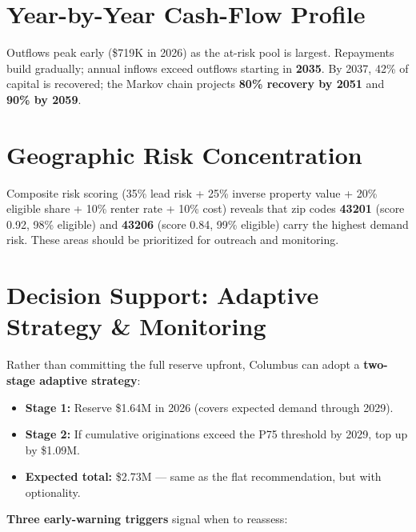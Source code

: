 \documentclass[11pt, letterpaper]{article}
\begin{document}
\vspace{-0.2cm}
\section*{Year-by-Year Cash-Flow Profile}

Outflows peak early (\$719K in 2026) as the at-risk pool is largest. Repayments build gradually; annual inflows exceed outflows starting in \textbf{2035}. By 2037, 42\% of capital is recovered; the Markov chain projects \textbf{80\% recovery by 2051} and \textbf{90\% by 2059}.

\vspace{-0.2cm}
\section*{Geographic Risk Concentration}

Composite risk scoring (35\% lead risk + 25\% inverse property value + 20\% eligible share + 10\% renter rate + 10\% cost) reveals that zip codes \textbf{43201} (score 0.92, 98\% eligible) and \textbf{43206} (score 0.84, 99\% eligible) carry the highest demand risk. These areas should be prioritized for outreach and monitoring.

\vspace{-0.2cm}
\section*{Decision Support: Adaptive Strategy \& Monitoring}

Rather than committing the full reserve upfront, Columbus can adopt a \textbf{two-stage adaptive strategy}:

\begin{itemize}[nosep, leftmargin=1.5em]
    \item \textbf{Stage 1:} Reserve \$1.64M in 2026 (covers expected demand through 2029).
    \item \textbf{Stage 2:} If cumulative originations exceed the P75 threshold by 2029, top up by \$1.09M.
    \item \textbf{Expected total:} \$2.73M --- same as the flat recommendation, but with optionality.
\end{itemize}

\noindent \textbf{Three early-warning triggers} signal when to reassess:
\end{document}
